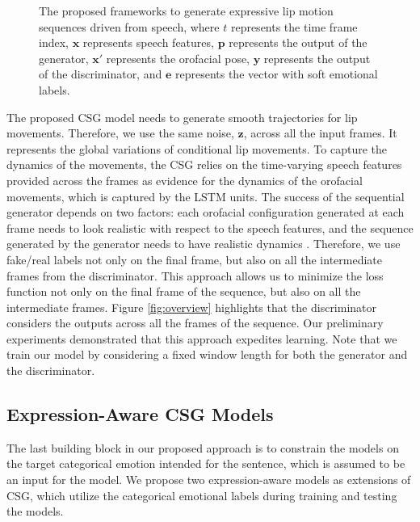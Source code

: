 \documentclass[10pt,journal,compsoc]{IEEEtran}
\begin{document}
\begin{figure}
	\centering
	\caption{The proposed frameworks to generate expressive lip motion sequences driven from speech, where $t$ represents the time frame index, $\mathbf{x}$ represents speech features, $\mathbf{p}$ represents the output of the generator, $\mathbf{x}'$ represents the orofacial pose, $\mathbf{y}$ represents the output of the discriminator, and $\mathbf{e}$ represents the vector with soft emotional labels.}		
	\label{fig:CSGmodels}
\end{figure}


The proposed CSG model needs to generate smooth trajectories for lip movements. Therefore, we use the same noise, $\mathbf{z}$, across all the input frames. It represents the global variations of conditional lip movements. To capture the dynamics of the movements, the CSG  relies on the time-varying speech features provided across the frames as evidence for the dynamics of the orofacial movements, which is captured by the LSTM units. The success of the sequential generator depends on two factors: each orofacial configuration generated at each frame needs to look realistic with respect to the speech features, and  the sequence generated by the generator needs to have realistic dynamics \cite{Tulyakov_2017}. Therefore, we use fake/real labels not only on the final frame, but also on all the intermediate frames from the discriminator. This approach allows us to minimize the loss function not only on the final frame of the sequence, but also on all the intermediate frames. Figure \ref{fig:overview} highlights that the discriminator considers the outputs across all the frames of the sequence. Our preliminary experiments demonstrated that this approach expedites learning. Note that we train our model by considering a fixed window length for both the generator and the discriminator.



\subsection{Expression-Aware CSG Models}
\label{sec:emotion-CSG}
The last building block in our proposed approach is to constrain the models on the target categorical emotion intended for the sentence, which is assumed to be an input for the model. We propose two expression-aware models as extensions of CSG, which utilize the categorical emotional labels during training and testing the models.
\end{document}
